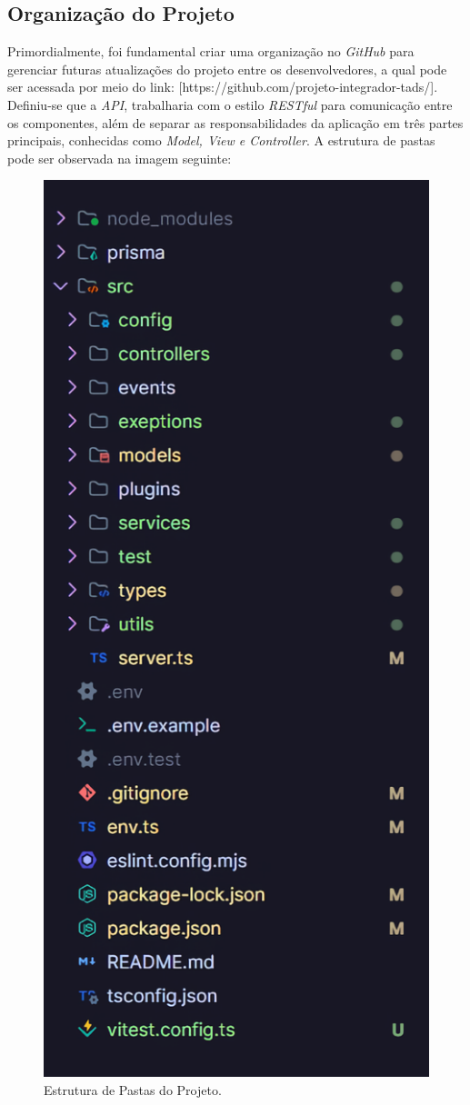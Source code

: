 \subsection{Organização do Projeto}

Primordialmente, foi fundamental criar uma organização no \textit{ GitHub} para gerenciar futuras atualizações do projeto entre os desenvolvedores, a qual pode ser acessada por meio do link: [https://github.com/projeto-integrador-tads/]. Definiu-se que a \textit{API}, trabalharia com o estilo \textit{RESTful} para comunicação entre os componentes, além de separar as responsabilidades da aplicação em três partes principais, conhecidas como \textit{Model, View e Controller}. A estrutura de pastas pode ser observada na imagem seguinte:


\begin{figure} [h!]
	\centering
	\caption{Estrutura de Pastas do Projeto.}
	\includegraphics[scale=0.3]{img/pastas.png}

\end{figure}
